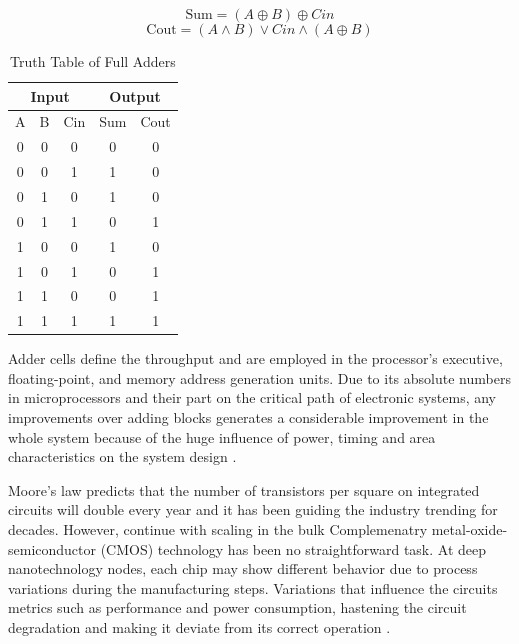 \documentclass[ecp,tc, english]{iiufrgs}
\newcommand*\xor{\mathbin{\oplus}}
\begin{document}
\begin{equation}
\label{eqn:01}
\text{Sum} = (A \xor{} B) \xor{} Cin
\end{equation}
\begin{equation}
\label{eqn:02}
\text{Cout} = (A \wedge B) \vee Cin \wedge (A \xor{} B)
\end{equation}

\begin{table}[H]
\centering
\caption{Truth Table of Full Adders}
\label{tab:01}
\begin{tabular}{ccccc}
\hline
\multicolumn{3}{c}{Input} & \multicolumn{2}{c}{Output} \\ \hline
A       & B      & Cin      & Sum          & Cout         \\ \hline
0       & 0      & 0        & 0            & 0            \\ \hline
0       & 0      & 1        & 1            & 0            \\ \hline
0       & 1      & 0        & 1            & 0            \\ \hline
0       & 1      & 1        & 0            & 1            \\ \hline
1       & 0      & 0        & 1            & 0            \\ \hline
1       & 0      & 1        & 0            & 1            \\ \hline
1       & 1      & 0        & 0            & 1            \\ \hline
1       & 1      & 1        & 1            & 1            \\ \hline
\end{tabular}
\end{table}

Adder cells define the throughput and are employed in the processor’s executive, floating-point, and memory address generation units. Due to its absolute numbers in microprocessors and their part on the critical path of electronic systems, any improvements over adding blocks generates a considerable improvement in the whole system because of the huge influence of power, timing and area characteristics on the system design \cite{shoarinejad:03}.

Moore’s law predicts that the number of transistors per square on integrated circuits will double every year and it has been guiding the industry trending for decades. However, continue with scaling in the bulk Complemenatry metal-oxide-semiconductor (CMOS) technology has been no straightforward task. At deep nanotechnology nodes, each chip may show different behavior due to process variations during the manufacturing steps. Variations that influence the circuits metrics such as performance and power consumption, hastening the circuit degradation and making it deviate from its correct operation \cite{abbas:15} \cite{nassif:08}. 
\end{document}

